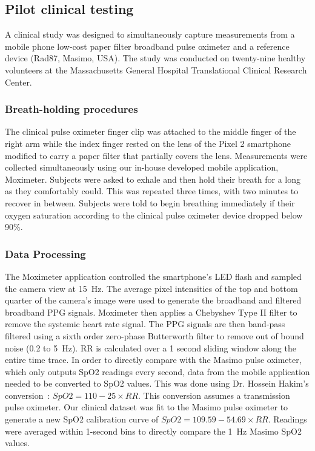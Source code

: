     \subsection{Pilot clinical testing}
    A clinical study was designed to simultaneously capture measurements from a mobile phone low-cost paper filter broadband pulse oximeter and a reference device (Rad87, Masimo, USA). The study was conducted on twenty-nine healthy volunteers at the Massachusetts General Hospital Translational Clinical Research Center. 
    
        \subsubsection{Breath-holding procedures}
        The clinical pulse oximeter finger clip was attached to the middle finger of the right arm while the index finger rested on the lens of the Pixel 2 smartphone modified to carry a paper filter that partially covers the lens. Measurements were collected simultaneously using our in-house developed mobile application, Moximeter. Subjects were asked to exhale and then hold their breath for a long as they comfortably could. This was repeated three times, with two minutes to recover in between. Subjects were told to begin breathing immediately if their oxygen saturation according to the clinical pulse oximeter device dropped below 90\%. 
        
        \subsubsection{Data Processing}
        The Moximeter application controlled the smartphone's LED flash and sampled the camera view at 15~Hz. The average pixel intensities of the top and bottom quarter of the camera's image were used to generate the broadband and filtered broadband PPG signals. Moximeter then applies a Chebyshev Type II filter to remove the systemic heart rate signal. The PPG signals are then band-pass filtered using a sixth order zero-phase Butterworth filter to remove out of bound noise (0.2 to 5~Hz). RR is calculated over a 1 second sliding window along the entire time trace. In order to directly compare with the Masimo pulse oximeter, which only outputs SpO2 readings every second, data from the mobile application needed to be converted to SpO2 values. This was done using Dr. Hossein Hakim’s conversion~\cite{Bailey2008}: $SpO2 = 110 - 25\times RR$. This conversion assumes a transmission pulse oximeter. Our clinical dataset was fit to the Masimo pulse oximeter to generate a new SpO2 calibration curve of $SpO2 = 109.59 - 54.69\times RR$. Readings were averaged within 1-second bins to directly compare the 1~Hz Masimo SpO2 values. 
        
